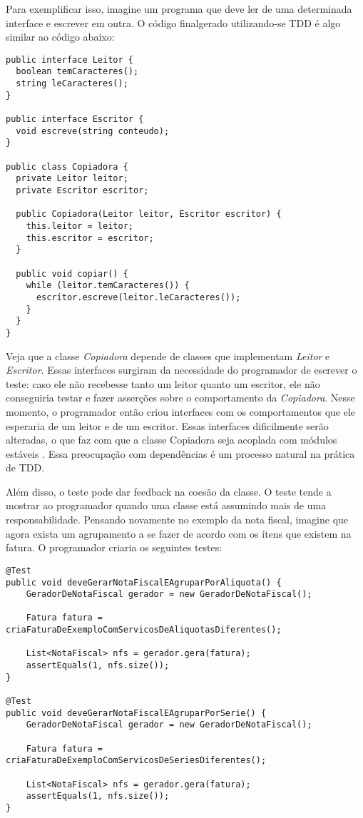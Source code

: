 Para exemplificar isso, imagine um programa que deve ler de uma determinada interface e escrever em outra. O código finalgerado 
utilizando-se TDD é algo similar ao código abaixo:

\begin{lstlisting}[frame=trbl]
public interface Leitor {
  boolean temCaracteres();
  string leCaracteres();
}

public interface Escritor {
  void escreve(string conteudo);
}

public class Copiadora {
  private Leitor leitor;
  private Escritor escritor;

  public Copiadora(Leitor leitor, Escritor escritor) {
    this.leitor = leitor;
    this.escritor = escritor;
  }

  public void copiar() {
    while (leitor.temCaracteres()) {
      escritor.escreve(leitor.leCaracteres());
    }
  }
}
\end{lstlisting}

Veja que a classe \textit{Copiadora} depende de classes que implementam \textit{Leitor} e \textit{Escritor}. Essas interfaces
surgiram da necessidade do programador de escrever o teste: caso ele não recebesse tanto um leitor quanto um escritor, ele não
conseguiria testar e fazer asserções sobre o comportamento da \textit{Copiadora}. Nesse momento, o programador então criou interfaces
com os comportamentos que ele esperaria de um leitor e de um escritor. Essas interfaces dificilmente serão alteradas, o que faz com que
a classe Copiadora seja acoplada com módulos estáveis \cite{bob-martin}. Essa preocupação com dependências é um processo natural na prática de TDD.

Além disso, o teste pode dar feedback na coesão da classe. O teste tende a mostrar ao programador quando uma classe está assumindo mais
de uma responsabilidade. Pensando novamente no exemplo da nota fiscal, imagine que agora exista um agrupamento a se fazer de acordo com os 
ítens que existem na fatura. O programador criaria os seguintes testes:

\begin{lstlisting}[frame=trbl]
@Test
public void deveGerarNotaFiscalEAgruparPorAliquota() {
	GeradorDeNotaFiscal gerador = new GeradorDeNotaFiscal();
	
	Fatura fatura = criaFaturaDeExemploComServicosDeAliquotasDiferentes();
	
	List<NotaFiscal> nfs = gerador.gera(fatura);
	assertEquals(1, nfs.size());
}

@Test
public void deveGerarNotaFiscalEAgruparPorSerie() {
	GeradorDeNotaFiscal gerador = new GeradorDeNotaFiscal();
	
	Fatura fatura = criaFaturaDeExemploComServicosDeSeriesDiferentes();
	
	List<NotaFiscal> nfs = gerador.gera(fatura);
	assertEquals(1, nfs.size());
}
\end{lstlisting}

